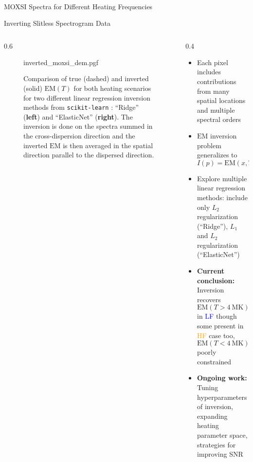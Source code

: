 \documentclass[final]{beamer}
\newlength{\colwidth}
\begin{document}
\begin{frame}[t]
\begin{columns}[t]
\begin{column}{\colwidth}
\begin{block}{MOXSI Spectra for Different Heating Frequencies}
  \end{block}

  \vspace{-30px}

  \begin{block}{Inverting Slitless Spectrogram Data}

    \begin{columns}[t]
      \begin{column}{0.6\colwidth}
        \begin{figure}
          \centering
          {inverted_moxsi_dem.pgf}
          \caption{Comparison of true (dashed) and inverted (solid) $\mathrm{EM}(T)$ for both heating scenarios for two different linear regression inversion methods from \texttt{scikit-learn} \citep{pedregosa_scikit-learn:_2011}: ``Ridge'' (\textbf{left}) and ``ElasticNet'' (\textbf{right}). The inversion is done on the spectra summed in the cross-dispersion direction and the inverted $\mathrm{EM}$ is then averaged in the spatial direction parallel to the dispersed direction.}
          \label{fig:inverted_moxsi_dem}
        \end{figure}
      \end{column}
      \begin{column}{0.4\colwidth}
        \begin{itemize}
          \item Each pixel includes contributions from \alert{many spatial locations} and \alert{multiple spectral orders}
          \item $\mathrm{EM}$ inversion problem generalizes to $I(p)=\mathrm{EM}(x,T)R(p,x,T)$ \citep{cheung_multi-component_2019}
          \item Explore multiple linear regression methods: include only $L_2$ regularization (``Ridge''), $L_1$ and $L_2$ regularization (``ElasticNet'')
          \item \alert{\textbf{Current conclusion:}} Inversion recovers $\mathrm{EM}(T>\SI{4}{\mega\kelvin})$ in \textcolor{blue}{LF} though some present in \textcolor{orange}{HF} case too, $\mathrm{EM}(T<\SI{4}{\mega\kelvin})$ poorly constrained
          \item \alert{\textbf{Ongoing work:}} Tuning hyperparameters of inversion, expanding heating parameter space, strategies for improving SNR
        \end{itemize}
      \end{column}
    \end{columns}


\end{block}
\end{column}
\end{columns}
\end{frame}
\end{document}
